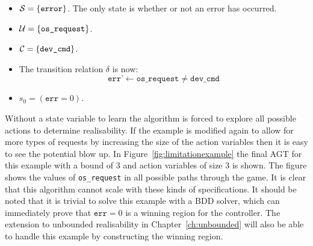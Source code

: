 \begin{itemize}
    \item $\mathcal{S} = \{ \texttt{error} \} $. The only state is whether or not an error has occurred. 
    \item $\mathcal{U} = \{ \texttt{os\_request} \} $. 
    \item $\mathcal{C} = \{ \texttt{dev\_cmd} \}$.
    \item The transition relation $\delta$ is now: $$ \texttt{err'} \gets \texttt{os\_request} \neq \texttt{dev\_cmd} $$
    \item $s_0 = (\texttt{err} = 0)$. 
\end{itemize}

Without a state variable to learn the algorithm is forced to explore all possible actions to determine realisability. If the example is modified again to allow for more types of requests by increasing the size of the action variables then it is easy to see the potential blow up. In Figure~\ref{fig:limitationexample} the final AGT for this example with a bound of $3$ and action variables of size $3$ is shown. The figure shows the values of \texttt{os\_request} in all possible paths through the game. It is clear that this algorithm cannot scale with these kinds of specifications. It should be noted that it is trivial to solve this example with a BDD solver, which can immediately prove that $\texttt{err} = 0$ is a winning region for the controller. The extension to unbounded realisability in Chapter~\ref{ch:unbounded} will also be able to handle this example by constructing the winning region.

